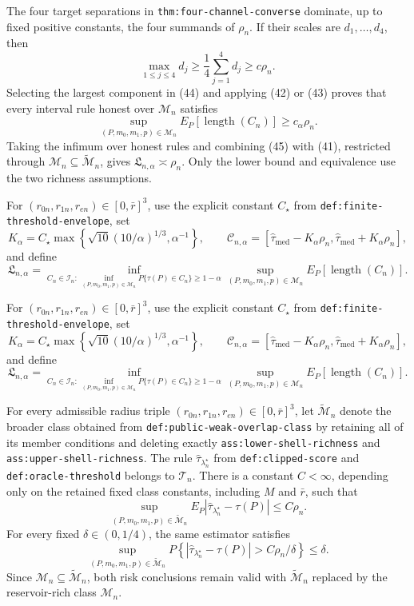 The four target separations in \texttt{thm:four-channel-converse} dominate,
up to fixed positive constants, the four summands of \(\rho_n\).  If their
scales are \(d_1,\ldots,d_4\), then
\[
\max_{1\leq j\leq4}d_j
\geq\frac14\sum_{j=1}^4d_j
\geq c\rho_n.                                                       \tag{44}
\]
Selecting the largest component in (44) and applying (42) or (43) proves that
every interval rule honest over \(\mathcal M_n\) satisfies
\[
\sup_{(P,m_0,m_1,p)\in\mathcal M_n}
E_P[\operatorname{length}(C_n)]\geq c_\alpha\rho_n.                 \tag{45}
\]
Taking the infimum over honest rules and combining (45) with (41), restricted
through \(\mathcal M_n\subseteq\widetilde{\mathcal M}_n\), gives
\(\mathfrak L_{n,\alpha}\asymp\rho_n\).  Only the lower bound and equivalence
use the two richness assumptions.

For \((r_{0n},r_{1n},r_{en})\in[0,\bar r]^3\), use the explicit constant
\(C_\star\) from \texttt{def:finite-threshold-envelope}, set
\[
K_\alpha=C_\star\max\left\{
\sqrt{10}(10/\alpha)^{1/3},\alpha^{-1}\right\},
\qquad
\mathcal C_{n,\alpha}
=\left[\widehat\tau_{\mathrm{med}}-K_\alpha\rho_n,
\widehat\tau_{\mathrm{med}}+K_\alpha\rho_n\right],
\]
and define
\[
\mathfrak L_{n,\alpha}
=\inf_{C_n\in\mathcal I_n:\,
\inf_{(P,m_0,m_1,p)\in\mathcal M_n}P\{\tau(P)\in C_n\}\geq1-\alpha}
\sup_{(P,m_0,m_1,p)\in\mathcal M_n}
E_P[\operatorname{length}(C_n)].
\]

For \((r_{0n},r_{1n},r_{en})\in[0,\bar r]^3\), use the explicit constant
\(C_\star\) from \texttt{def:finite-threshold-envelope}, set
\[
K_\alpha=C_\star\max\left\{
\sqrt{10}(10/\alpha)^{1/3},\alpha^{-1}\right\},
\qquad
\mathcal C_{n,\alpha}
=\left[\widehat\tau_{\mathrm{med}}-K_\alpha\rho_n,
\widehat\tau_{\mathrm{med}}+K_\alpha\rho_n\right],
\]
and define
\[
\mathfrak L_{n,\alpha}
=\inf_{C_n\in\mathcal I_n:\,
\inf_{(P,m_0,m_1,p)\in\mathcal M_n}P\{\tau(P)\in C_n\}\geq1-\alpha}
\sup_{(P,m_0,m_1,p)\in\mathcal M_n}
E_P[\operatorname{length}(C_n)].
\]

For every admissible radius triple \((r_{0n},r_{1n},r_{en})\in[0,\bar r]^3\), let \(\widetilde{\mathcal M}_n\) denote the broader class obtained from \texttt{def:public-weak-overlap-class} by retaining all of its member conditions and deleting exactly \texttt{ass:lower-shell-richness} and \texttt{ass:upper-shell-richness}.  The rule \(\widehat\tau_{\lambda_n^{\star}}\) from \texttt{def:clipped-score} and \texttt{def:oracle-threshold} belongs to \(\mathcal T_n\).  There is a constant \(C<\infty\), depending only on the retained fixed class constants, including \(M\) and \(\bar r\), such that
\[
\sup_{(P,m_0,m_1,p)\in\widetilde{\mathcal M}_n}
E_P\!\left|\widehat\tau_{\lambda_n^{\star}}-\tau(P)\right|
\leq C\rho_n.
\]
For every fixed \(\delta\in(0,1/4)\), the same estimator satisfies
\[
\sup_{(P,m_0,m_1,p)\in\widetilde{\mathcal M}_n}
P\!\left\{\left|\widehat\tau_{\lambda_n^{\star}}-\tau(P)\right|
>C\rho_n/\delta\right\}\leq\delta.
\]
Since \(\mathcal M_n\subseteq\widetilde{\mathcal M}_n\), both risk conclusions remain valid with \(\widetilde{\mathcal M}_n\) replaced by the reservoir-rich class \(\mathcal M_n\).

